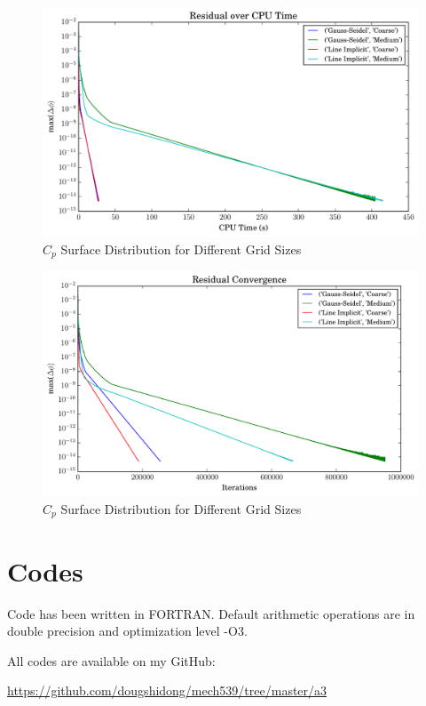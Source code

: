 \documentclass[letterpaper,12pt,]{article}
\begin{document}
\begin{figure}[!htbp]
    \centering
    \includegraphics[width=\linewidth]{./Figures/q4time.pdf}
    \caption{$C_p$ Surface Distribution for Different Grid Sizes}
    \label{fig:q4time}
\end{figure}

\begin{figure}[!htbp]
    \centering
    \includegraphics[width=\linewidth]{./Figures/q4res.pdf}
    \caption{$C_p$ Surface Distribution for Different Grid Sizes}
    \label{fig:q4res}
\end{figure}

\clearpage
\section*{Codes}

Code has been written in FORTRAN. Default arithmetic operations are in double precision and optimization level -O3.

All codes are available on my GitHub:

\url{https://github.com/dougshidong/mech539/tree/master/a3}
\end{document}
